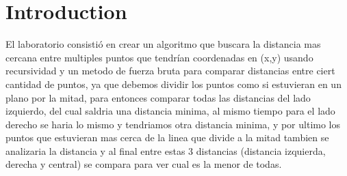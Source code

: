 \section{Introduction} 
El laboratorio consistió en crear un algoritmo que buscara la distancia mas cercana entre multiples puntos que tendrían coordenadas en (x,y) usando recursividad y un metodo de fuerza bruta para comparar distancias entre ciert cantidad de puntos, ya que debemos dividir los puntos como si estuvieran en un plano por la mitad, para entonces comparar todas las distancias del lado izquierdo, del cual saldria una distancia minima, al mismo tiempo para el lado derecho se haria lo mismo y tendriamos otra distancia minima, y por ultimo los puntos que estuvieran mas cerca de la linea que divide a la mitad tambien se analizaria la distancia y al final entre estas 3 distancias (distancia izquierda, derecha y central) se compara para ver cual es la menor de todas.